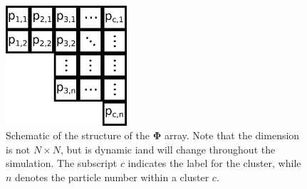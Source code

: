 \begin{figure}[h]
	\begin{center}
		\includegraphics[width = 0.4\textwidth]{fig/clusters_schematics.png}
		\caption{Schematic of the structure of the $\mathbf{\Phi}$ array. Note that the dimension is not $N \times N$, but is dynamic iand will change throughout the simulation. The subscript $c$ indicates the label for the cluster, while $n$ denotes the particle number within a cluster $c$.}
		\label{fig:clusters_schematics}
	\end{center}
\end{figure}

